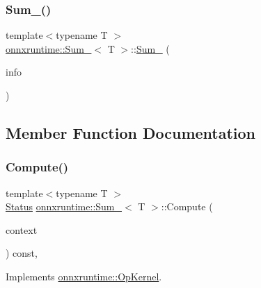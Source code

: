 \subsubsection{\texorpdfstring{Sum\+\_()}{Sum\_6()}}
{\footnotesize\ttfamily template$<$typename T $>$ \\
\mbox{\hyperlink{classonnxruntime_1_1Sum__6}{onnxruntime\+::\+Sum\+\_}}$<$ T $>$\+::\mbox{\hyperlink{classonnxruntime_1_1Sum__6}{Sum\+\_}} (\begin{DoxyParamCaption}\item[{const \mbox{\hyperlink{classonnxruntime_1_1OpKernelInfo}{Op\+Kernel\+Info}} \&}]{info }\end{DoxyParamCaption})\hspace{0.3cm}{\ttfamily [inline]}}



\subsection{Member Function Documentation}
\mbox{\label{classonnxruntime_1_1Sum__6_aaa5c575ed8920c1b030d4d08fe311f2c}} 
\subsubsection{\texorpdfstring{Compute()}{Compute()}\hspace{0.1cm}{\footnotesize\ttfamily [1/2]}}
{\footnotesize\ttfamily template$<$typename T $>$ \\
\mbox{\hyperlink{classonnxruntime_1_1common_1_1Status}{Status}} \mbox{\hyperlink{classonnxruntime_1_1Sum__6}{onnxruntime\+::\+Sum\+\_}}$<$ T $>$\+::Compute (\begin{DoxyParamCaption}\item[{\mbox{\hyperlink{classonnxruntime_1_1OpKernelContext}{Op\+Kernel\+Context}} $\ast$}]{context }\end{DoxyParamCaption}) const\hspace{0.3cm}{\ttfamily [override]}, {\ttfamily [virtual]}}



Implements \mbox{\hyperlink{classonnxruntime_1_1OpKernel_a9eca8656a78b1b3ab9d3351a12798650}{onnxruntime\+::\+Op\+Kernel}}.

\mbox{\label{classonnxruntime_1_1Sum__6_a6f6600ed769bc41914f255ff24beb22f}} 
